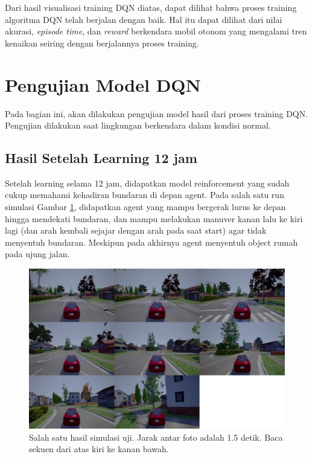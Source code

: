 Dari hasil visualisasi training DQN diatas, dapat dilihat bahwa proses training algoritma DQN telah berjalan dengan baik. Hal itu dapat dilihat dari nilai akurasi, \textit{episode time}, dan \textit{reward} berkendara mobil otonom yang mengalami tren kenaikan seiring dengan berjalannya proses training.

\section{Pengujian Model DQN}
\label{sec:pengujian_model_dqn}

Pada bagian ini, akan dilakukan pengujian model hasil dari proses training DQN. Pengujian dilakukan saat lingkungan berkendara dalam kondisi normal.

\subsection{Hasil Setelah Learning 12 jam}
\label{sec:hasil_learning_12}
Setelah learning selama 12 jam, didapatkan model reinforcement yang sudah cukup memahami kehadiran bundaran di depan agent. Pada salah satu run simulasi Gambar \ref{fig:uji0}, didapatkan agent yang mampu bergerak lurus ke depan hingga mendekati bundaran, dan mampu melakukan manuver kanan lalu ke kiri lagi (dan arah kembali sejajar dengan arah pada saat start) agar tidak menyentuh bundaran. Meskipun pada akhirnya agent menyentuh object rumah pada ujung jalan.

\begin{figure}[H] 
	\centering
	\includegraphics[width=1\linewidth]{images/uji0}
	\caption{Salah satu hasil simulasi uji. Jarak antar foto adalah 1.5 detik. Baca sekuen dari atas kiri ke kanan bawah.}
	\label{fig:uji0}
\end{figure}

